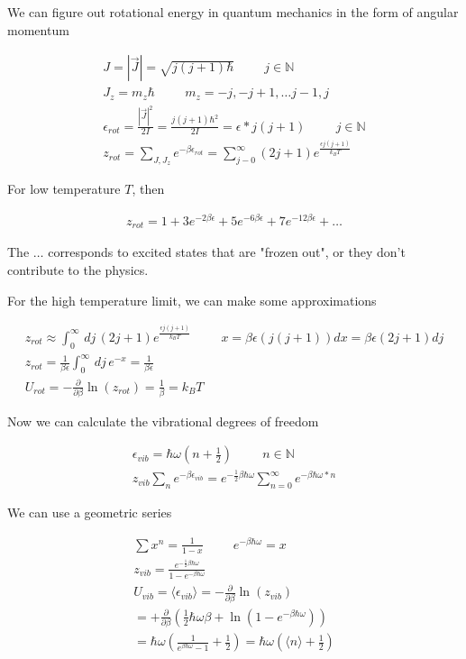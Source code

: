\documentclass[fleqn]{report}
\newcommand{\hp}{\hspace{1cm}}
\newcommand{\del}{\partial}
\newcommand{\equations} [1] {
\begin{gather*}
#1
\end{gather*}
}
\begin{document}
We can figure out rotational energy in quantum mechanics in the 
form of angular momentum 
\equations{
    J 
    =
    |\vec J| 
    =
    \sqrt{j(j+1) \hbar} \hp j \in \mathbb{N} 
    \\
    J_z 
    =
    m_z \hbar 
    \hp 
    m_z = -j, -j+1, \ldots j-1, j
    \\
    \epsilon_{rot}
    =
    \frac{|\vec J|^2}{2 I}
    =
    \frac{j(j+1) \hbar^2}{2 I}
    = 
    \epsilon * j(j+1)
    \hp 
    j \in \mathbb{N}
    \\
    z_{rot}
    =
    \sum_{J, J_z}
    e^{- \beta \epsilon_{rot}}
    =
    \sum^{\infty}_{j-0}
    (2j + 1) e^{\frac{\epsilon j(j+1)}{k_B T}}
}

For low temperature $T$, then 
\equations{
    z_{rot}
    =
    1 
    +
    3 e^{-2 \beta \epsilon}
    +
    5 e^{-6 \beta \epsilon}
    +
    7 e^{-12 \beta \epsilon}
    +
    \ldots
}

The $\ldots$ corresponds to excited states that are "frozen out", 
or they don't contribute to the physics.

For the high temperature limit, we can make some approximations 
\equations{
    z_{rot}
    \approx
    \int^{\infty}_{0} \, dj \, 
    (2j + 1) e^{\frac{\epsilon j(j+1)}{k_B T}}
    \hp 
    x = \beta \epsilon(j(j+1))
    dx = \beta \epsilon(2j + 1) dj
    \\
    z_{rot}
    =
    \frac{1}{\beta \epsilon}
    \int^{\infty}_{0} \, dj \, 
    e^{-x}
    =
    \frac{1}{\beta \epsilon}
    \\
    U_{rot}
    =
    -\frac{\del}{\del \beta}
    \ln(z_{rot})
    =
    \frac{1}{\beta}
    =
    k_B T
}


Now we can calculate the vibrational degrees of freedom 
\equations{
    \epsilon_{vib}
    =
    \hbar \omega (n + \frac{1}{2})
    \hp 
    n \in \mathbb{N}
    \\
    z_{vib}
    \sum_n 
    e^{- \beta \epsilon_{vib}}
    =
    e^{- \frac{1}{2} \beta \hbar \omega}
    \sum_{n = 0}^{\infty}
    e^{- \beta \hbar \omega * n}
}

We can use a geometric series 
\equations{
    \sum x^n = \frac{1}{1-x}
    \hp 
    e^{-\beta \hbar \omega}
    =
    x
    \\
    z_{vib}
    =
    \frac{e^{- \frac{1}{2} \beta \hbar \omega}}{{1 - e^{- \beta \hbar \omega}}}
    \\
    U_{vib}
    =
    \langle \epsilon_{vib} \rangle 
    =
    - \frac{\del}{\del \beta}
    \ln(z_{vib})
    \\
    =
    + \frac{\del}{\del \beta}
    \left(
        \frac{1}{2} \hbar \omega \beta 
        +
        \ln(1 - e^{- \beta \hbar \omega})
    \right)
    \\
    =
    \hbar \omega 
    \left(
        \frac{1}{e^{\beta \hbar \omega} - 1} 
        +
        \frac{1}{2}
    \right)
    =
    \hbar \omega 
    \left(
        \langle n \rangle 
        +
        \frac{1}{2}
    \right)
}
\end{document}
